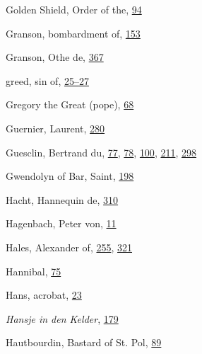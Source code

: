 Golden Shield, Order of the,
\protect\hyperlink{10_Chapter_Three__THE_HEROIC_DREAM.xhtmlux5cux23page_94}{94}

Granson, bombardment of,
\protect\hyperlink{11_Chapter_Four__THE_FORMS_OF_LOVE.xhtmlux5cux23page_153}{153}

Granson, Othe de,
\protect\hyperlink{21_Chapter_Thirteen__IMAGE_AND_WORD.xhtmlux5cux23page_367}{367}

greed, sin of,
\protect\hyperlink{08_Chapter_One__THE_PASSIONATE_INTE.xhtmlux5cux23page_25}{25--}\protect\hyperlink{08_Chapter_One__THE_PASSIONATE_INTE.xhtmlux5cux23page_27}{27}

Gregory the Great (pope),
\protect\hyperlink{10_Chapter_Three__THE_HEROIC_DREAM.xhtmlux5cux23page_68}{68}

Guernier, Laurent,
\protect\hyperlink{18_Chapter_Eleven__THE_FORMS_OF_THO.xhtmlux5cux23page_280}{280}

Guesclin, Bertrand du,
\protect\hyperlink{10_Chapter_Three__THE_HEROIC_DREAM.xhtmlux5cux23page_77}{77},
\protect\hyperlink{10_Chapter_Three__THE_HEROIC_DREAM.xhtmlux5cux23page_78}{78},
\protect\hyperlink{10_Chapter_Three__THE_HEROIC_DREAM.xhtmlux5cux23page_100}{100},
\protect\hyperlink{14_Chapter_Seven__THE_PIOUS_PERSONA.xhtmlux5cux23page_211}{211},
\protect\hyperlink{20_ILLUSTRATIONS_FOLLOW_PAGE.xhtmlux5cux23page_298}{298}

Gwendolyn of Bar, Saint,
\protect\hyperlink{13_Chapter_Six__THE_DEPICTION_OF_TH.xhtmlux5cux23page_198}{198}

Hacht, Hannequin de,
\protect\hyperlink{20_ILLUSTRATIONS_FOLLOW_PAGE.xhtmlux5cux23page_310}{310}

Hagenbach, Peter von,
\protect\hyperlink{08_Chapter_One__THE_PASSIONATE_INTE.xhtmlux5cux23page_11}{11}

Hales, Alexander of,
\protect\hyperlink{17_Chapter_Ten__THE_FAILURE_OF_IMAG.xhtmlux5cux23page_255}{255},
\protect\hyperlink{20_ILLUSTRATIONS_FOLLOW_PAGE.xhtmlux5cux23page_321}{321}

Hannibal,
\protect\hyperlink{10_Chapter_Three__THE_HEROIC_DREAM.xhtmlux5cux23page_75}{75}

Hans, acrobat,
\protect\hyperlink{08_Chapter_One__THE_PASSIONATE_INTE.xhtmlux5cux23page_23}{23}

\emph{Hansje in den Kelder},
\protect\hyperlink{13_Chapter_Six__THE_DEPICTION_OF_TH.xhtmlux5cux23page_179}{179}

Hautbourdin, Bastard of St. Pol,
\protect\hyperlink{10_Chapter_Three__THE_HEROIC_DREAM.xhtmlux5cux23page_89}{89}

